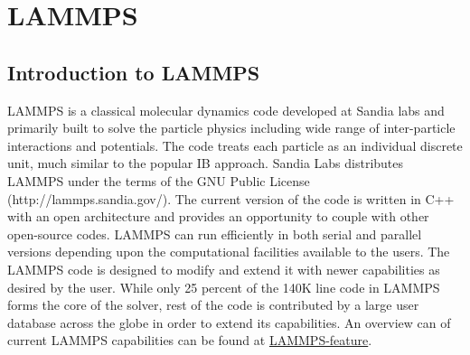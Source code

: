 \documentclass[11pt,a4paper,openright]{article}
\begin{document}
%
\section{LAMMPS}
\subsection{Introduction to LAMMPS}
LAMMPS is a classical molecular dynamics code developed at Sandia labs and primarily built to solve the particle physics including wide range of inter-particle interactions and potentials. The code treats each particle as an individual discrete unit, much similar to the popular IB approach. Sandia Labs distributes LAMMPS under the terms of the GNU Public License (http://lammps.sandia.gov/). The current version of the code is written in C++ with an open architecture and provides an opportunity to couple with other open-source codes. LAMMPS can run efficiently in both serial and parallel versions depending upon the computational facilities available to the users.  The LAMMPS code is designed to modify and extend it with newer capabilities as desired by the user. While only 25 percent of the 140K line code in LAMMPS forms the core of the solver, rest of the code is contributed by a large user database across the globe in order to extend its capabilities. An overview can of current LAMMPS capabilities can be found at \href{http://lammps.sandia.gov/features.html}{LAMMPS-feature}.
\end{document}
